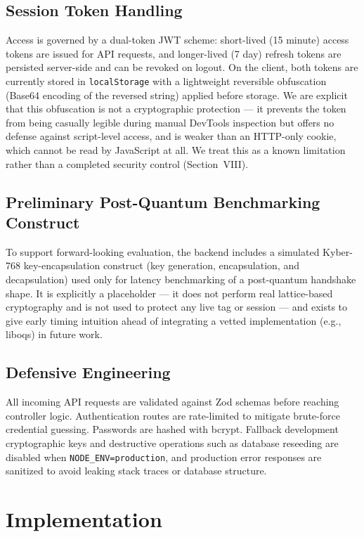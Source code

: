 \documentclass[conference]{IEEEtran}
\begin{document}
\subsection{Session Token Handling}
Access is governed by a dual-token JWT scheme: short-lived (15 minute) access tokens are issued for API requests, and longer-lived (7 day) refresh tokens are persisted server-side and can be revoked on logout. On the client, both tokens are currently stored in \texttt{localStorage} with a lightweight reversible obfuscation (Base64 encoding of the reversed string) applied before storage. We are explicit that this obfuscation is not a cryptographic protection --- it prevents the token from being casually legible during manual DevTools inspection but offers no defense against script-level access, and is weaker than an HTTP-only cookie, which cannot be read by JavaScript at all. We treat this as a known limitation rather than a completed security control (Section~VIII).

\subsection{Preliminary Post-Quantum Benchmarking Construct}
To support forward-looking evaluation, the backend includes a simulated Kyber-768 key-encapsulation construct (key generation, encapsulation, and decapsulation) used only for latency benchmarking of a post-quantum handshake shape. It is explicitly a placeholder --- it does not perform real lattice-based cryptography and is not used to protect any live tag or session --- and exists to give early timing intuition ahead of integrating a vetted implementation (e.g., liboqs) in future work.

\subsection{Defensive Engineering}
All incoming API requests are validated against Zod schemas before reaching controller logic. Authentication routes are rate-limited to mitigate brute-force credential guessing. Passwords are hashed with bcrypt. Fallback development cryptographic keys and destructive operations such as database reseeding are disabled when \texttt{NODE\_ENV=production}, and production error responses are sanitized to avoid leaking stack traces or database structure.

\section{Implementation}
\end{document}
